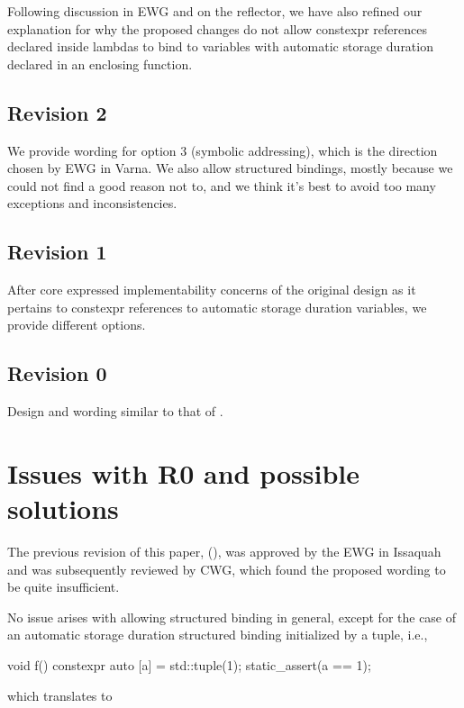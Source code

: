 \documentclass{wg21}
\begin{document}
Following discussion in EWG and on the reflector, we have also refined our explanation for why the proposed changes do not allow constexpr references declared inside lambdas to bind to variables with automatic storage duration declared in an enclosing function.

\subsection{Revision 2}

We provide wording for option 3 (symbolic addressing), which is the direction chosen by EWG in Varna.
We also allow  structured bindings, mostly because we could not find a good reason not to,
and we think it's best to avoid too many exceptions and inconsistencies.

\subsection{Revision 1}

After core expressed implementability concerns of the original design as it pertains to constexpr references to automatic storage duration variables, we provide different options.

\subsection{Revision 0}

Design and wording similar to that of .

\section{Issues with R0 and possible solutions}

The previous revision of this paper, (), was approved by the EWG in Issaquah and was subsequently
reviewed by CWG, which found the proposed wording to be quite insufficient.

No issue arises with allowing  structured binding in general, except for the case of an automatic storage duration structured binding
initialized by a tuple, i.e.,

\begin{colorblock}
void f() {
    constexpr auto [a] = std::tuple(1);
    static_assert(a == 1);
}
\end{colorblock}

which translates to
\end{document}
